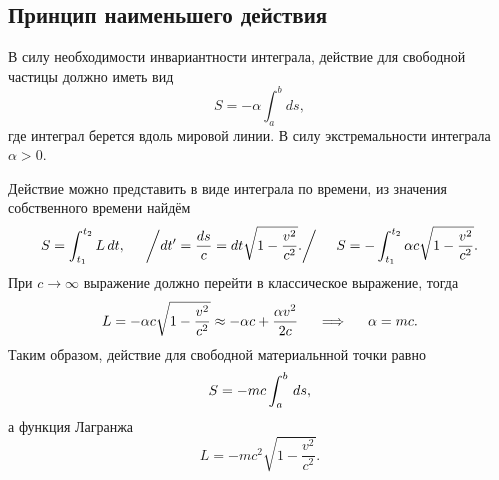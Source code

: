 \subsection{Принцип наименьшего действия}

В силу необходимости инвариантности интеграла, действие для свободной частицы должно иметь вид
$$
    S = - \alpha \int_{a}^{b} ds,
$$
где интеграл берется вдоль мировой линии. В силу экстремальности интеграла $\alpha > 0$. 

Действие можно представить в виде интеграла по времени, из значения собственного времени найдём
\begin{equation}
    S = \int_{t_1}^{t_2} L \, d t,
    \hspace{0.5cm} \bigg/
        dt' = \frac{ds}{c} = dt \sqrt{1 - \frac{v^2}{c^2}}.
    \bigg/ \hspace{0.5cm} 
    S = - \int_{t_1}^{t_2} \alpha c \sqrt{1 - \frac{v^2}{c^2} }.
\end{equation}
При $c \to \infty$  выражение должно перейти в классическое выражение, тогда
$$
    L = -\alpha c \sqrt{1 - \frac{v^2}{c^2} } \approx - \alpha c + \frac{\alpha v^2}{2c}
    \hspace{0.5cm} 
        \Longrightarrow
    \hspace{0.5cm} 
    \alpha = mc.
$$
Таким образом, действие для свободной материальнной точки равно 
\begin{equation}
\label{8_1}
    S = -mc \int_{a}^{b } \, d s,
\end{equation}
а функция Лагранжа
\begin{equation}
\label{8_2}
    L = -mc^2 \sqrt{1 - \frac{v^2}{c^2} }.
\end{equation}

